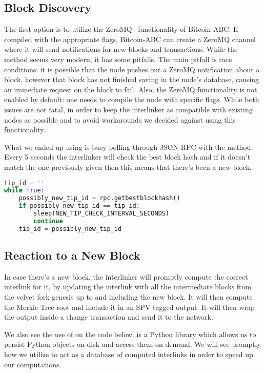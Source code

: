 \subsection{Block Discovery}

The first option is to utilize the ZeroMQ~\cite{zmq} functionality of Bitcoin-ABC. If compiled with the appropriate flags, Bitcoin-ABC can create a ZeroMQ channel where it will send notifications for new blocks and transactions. While the method seems very modern, it has some pitfalls. The main pitfall is race conditions: it is possible that the node pushes out a ZeroMQ notification about a block, however that block has not finished saving in the node's database, causing an immediate  request on the block to fail. Also, the ZeroMQ functionality is not enabled by default: one needs to compile the node with specific flags. While both issues are not fatal, in order to keep the interlinker as compatible with existing nodes as possible and to avoid workarounds we decided against using this functionality.

What we ended up using is busy polling through JSON-RPC with the  method. Every 5 seconds the interlinker will check the best block hash and if it doesn't match the one previously given then this means that there's been a new block.

\begin{lstlisting}[language=Python]
tip_id = ''
while True:
    possibly_new_tip_id = rpc.getbestblockhash()
    if possibly_new_tip_id == tip_id:
        sleep(NEW_TIP_CHECK_INTERVAL_SECONDS)
        continue
    tip_id = possibly_new_tip_id
\end{lstlisting}

\subsection{Reaction to a New Block}

In case there's a new block, the interlinker will promptly compute the correct interlink for it, by updating the interlink with all the intermediate blocks from the velvet fork genesis up to and including the new block. It will then compute the Merkle Tree root and include it in an SPV tagged output. It will then wrap the output inside a change transaction and send it to the network.

We also see the use of  on the code below.  is a Python library which allows us to persist Python objects on disk and access them on demand. We will see promptly how we utilize  to act as a database of computed interlinks in order to speed up our computations.

